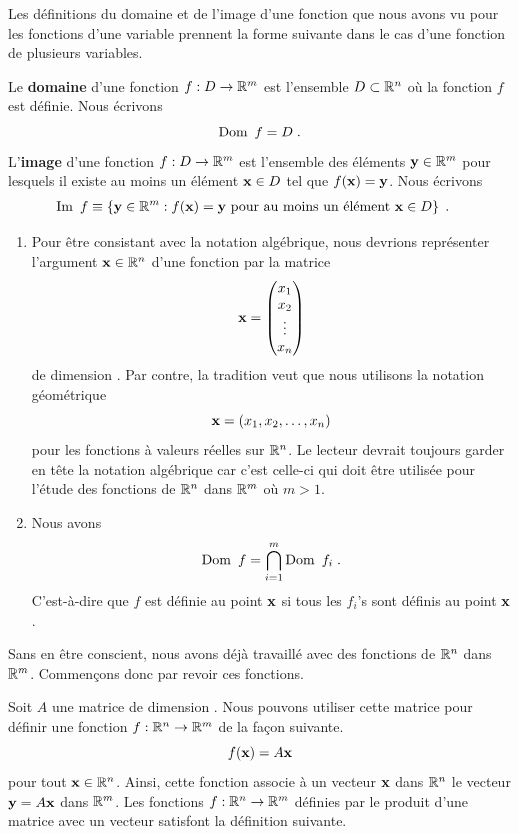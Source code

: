 {Les définitions du domaine et de l'image d'une fonction que nous avons
vu pour les fonctions d'une variable prennent la forme suivante dans
le cas d'une fonction de plusieurs variables.

\begin{focus}{\dfn}
Le {\bfseries domaine} d'une fonction
$f:D \rightarrow \mathbb{R}^m$ est l'ensemble $D \subset \mathbb{R}^n$ où la fonction $f$
est définie.  Nous écrivons
\[
\DO f = D \; .
\]
L'{\bfseries image} d'une fonction $f:D \rightarrow \mathbb{R}^m$ est
l'ensemble des éléments $\mathbf{y} \in \mathbb{R}^m$ pour lesquels il existe au
moins un élément $\mathbf{x} \in D$ tel que $f(\mathbf{x}) = \mathbf{y}$.
  Nous écrivons
\begin{align*}
\IM f &\equiv \left\{ \VEC{y} \in \RR^m : f(\VEC{x}) = \VEC{y}
\text{ pour au moins un élément } \VEC{x} \in D \right\} \; .
\end{align*}
\end{focus}

\begin{rmkList}
\begin{enumerate}
\item Pour être consistant avec la notation algébrique, nous devrions
représenter l'argument $\mathbf{x} \in \mathbb{R}^n$ d'une fonction par la matrice
\[
\mathbf{x} = \begin{pmatrix} x_1 \\ x_2 \\ \vdots \\ x_n
\end{pmatrix}
\]
de dimension .  Par contre, la tradition veut que nous
utilisons la notation géométrique
\[
\mathbf{x} = \left(x_1 , x_2 , \ldots , x_n \right)
\]
pour les fonctions à valeurs réelles sur $\mathbb{R}^n$.  Le lecteur devrait
toujours garder en tête la notation algébrique car c'est celle-ci qui
doit être utilisée pour l'étude des fonctions de $\mathbb{R}^n$ dans $\mathbb{R}^m$
où $m>1$.
\item Nous avons
\[
\DO f = \bigcap_{i=1}^m \DO f_i \; .
\]
C'est-à-dire que $f$ est définie au point $\mathbf{x}$ si tous les
$f_i$'s sont définis au point $\mathbf{x}$.
\end{enumerate}
\end{rmkList}

Sans en être conscient, nous avons déjà travaillé avec des fonctions
de $\mathbb{R}^n$ dans $\mathbb{R}^m$.  Commençons donc par revoir ces fonctions.

Soit $A$ une matrice de dimension .  Nous pouvons utiliser cette
matrice pour définir une fonction $f:\mathbb{R}^n\rightarrow \mathbb{R}^m$ de la
façon suivante.
\[
f(\mathbf{x}) = A\mathbf{x}
\]
pour tout $\mathbf{x} \in \mathbb{R}^n$.  Ainsi, cette fonction associe à un
vecteur $\mathbf{x}$ dans $\mathbb{R}^n$ le vecteur $\mathbf{y} = A\mathbf{x}$ dans
$\mathbb{R}^m$.  Les fonctions $f:\mathbb{R}^n\rightarrow \mathbb{R}^m$ définies par le
produit d'une matrice avec un vecteur satisfont la définition
suivante.

}
